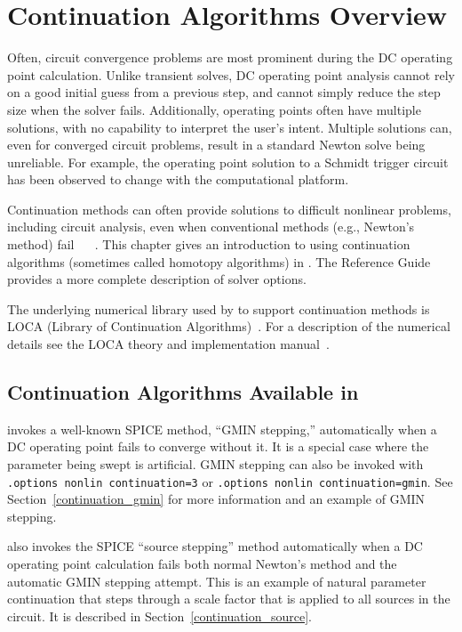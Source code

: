 \section{Continuation Algorithms Overview}

\label{continuation_Overview}

Often, circuit convergence problems are most prominent during the DC operating
point calculation. Unlike transient solves, DC operating point analysis cannot
rely on a good initial guess from a previous step, and cannot simply reduce the
step size when the solver fails. Additionally, operating points often have
multiple solutions, with no capability to interpret the user's intent. Multiple
solutions can, even for converged circuit problems, result in a standard Newton
solve being unreliable. For example, the operating point solution to a Schmidt
trigger circuit has been observed to change with the computational platform.

Continuation methods can often provide solutions to difficult nonlinear problems,
including circuit analysis, even when conventional methods (e.g., Newton's
method) fail ~\cite{Melville:1990} ~\cite{Melville:1993}.  This chapter gives
an introduction to using continuation algorithms (sometimes called homotopy 
algorithms) in \Xyce{}. The \Xyce{} Reference Guide\ReferenceGuide{} provides a
more complete description of solver options.

The underlying numerical library used by \Xyce{} to support continuation methods
is LOCA (Library of Continuation Algorithms)~\cite{loca,loca2}.  For a description 
of the numerical details see the LOCA theory and implementation 
manual~\cite{locaManual}.

\subsection{Continuation Algorithms Available in \Xyce{}}

\Xyce{} invokes a well-known SPICE method, ``GMIN stepping,'' automatically
when a DC operating point fails to converge without it.  It is a special case
where the parameter being swept is artificial.  GMIN stepping can also be
invoked with \texttt{.options nonlin continuation=3} or \texttt{.options nonlin
continuation=gmin}. See Section~\ref{continuation_gmin} for more information and an
example of GMIN stepping.

\Xyce{} also invokes the SPICE ``source stepping'' method automatically when a DC 
operating point calculation fails both normal Newton's method and the automatic 
GMIN stepping attempt.  This is an example of natural parameter continuation that 
steps through a scale factor that is applied to all sources in the circuit.  It is 
described in Section~\ref{continuation_source}.

